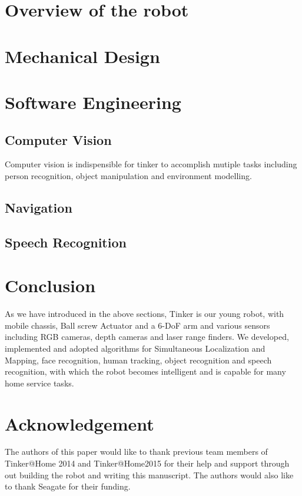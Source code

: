 \documentclass[runningheads,a4paper]{llncs}
\begin{document}
\section{Overview of the robot}



\section{Mechanical Design}


\section{Software Engineering}
\subsection{Computer Vision}
Computer vision is indispensible for tinker to accomplish mutiple tasks including person recognition, object manipulation and environment modelling.


\subsection{Navigation}


\subsection{Speech Recognition}




\section{Conclusion}

As we have introduced in the above sections, Tinker is our young robot, with mobile chassis, Ball screw Actuator and a 6-DoF arm and various sensors including RGB cameras, depth cameras and laser range finders. We developed, implemented and adopted algorithms for Simultaneous Localization and Mapping, face recognition, human tracking, object recognition and speech recognition, with which the robot becomes intelligent and is capable for many home service tasks. 



\section*{Acknowledgement}
The authors of this paper would like to thank previous team members of Tinker@Home 2014 and Tinker@Home2015 for their help and support through out building the robot and writing this manuscript. The authors would also like to thank Seagate for their funding. 



\end{document}
